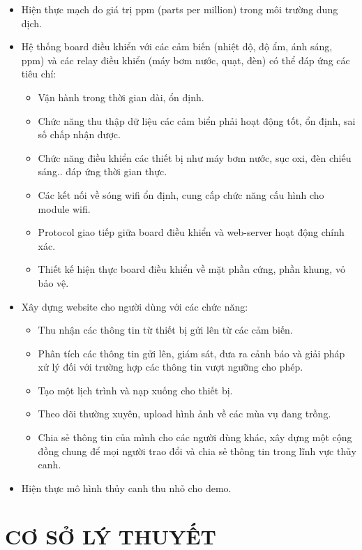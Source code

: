 \documentclass[a4paper,12pt,oneside]{article}
\begin{document}
\begin{itemize}
\item Hiện thực mạch đo giá trị ppm (parts per million) trong môi trường dung dịch.
\item Hệ thống board điều khiển với các cảm biến (nhiệt độ, độ ẩm, ánh sáng, ppm) và các relay điều khiển (máy bơm nước, quạt, đèn) có thể đáp ứng các tiêu chí:
	\begin{itemize}
		\item Vận hành trong thời gian dài, ổn định.
		\item Chức năng thu thập dữ liệu các cảm biển phải hoạt động tốt, ổn định, sai số chấp nhận được.
		\item Chức năng điều khiển các thiết bị như máy bơm nước, sục oxi, đèn chiếu sáng.. đáp ứng thời gian thực.
		\item Các kết nối về sóng wifi ổn định, cung cấp chức năng cấu hình cho module wifi.
		\item Protocol giao tiếp giữa board điều khiển và web-server hoạt động chính xác.
		\item Thiết kế hiện thực board điều khiển về mặt phần cứng, phần khung, vỏ bảo vệ.
	\end{itemize} 
\item Xây dựng website cho người dùng với các chức năng:
	\begin{itemize}
		\item Thu nhận các thông tin từ thiết bị  gửi lên từ các cảm biến.
		\item Phân tích các thông tin gửi lên, giám sát, đưa ra cảnh báo và giải pháp xử lý đối với trường hợp các thông tin vượt ngưỡng cho phép.
		\item Tạo một lịch trình và nạp xuống cho thiết bị.
		\item Theo dõi thường xuyên, upload hình ảnh về các mùa vụ đang trồng.
		\item Chia sẻ thông tin của mình cho các người dùng khác, xây dựng một cộng đồng chung để mọi người trao đổi và chia sẻ thông tin trong lĩnh vực thủy canh.
	\end{itemize}
\item Hiện thực mô hình thủy canh thu nhỏ cho demo.
\end{itemize}


\newpage

\section{CƠ SỞ LÝ THUYẾT}
\end{document}
